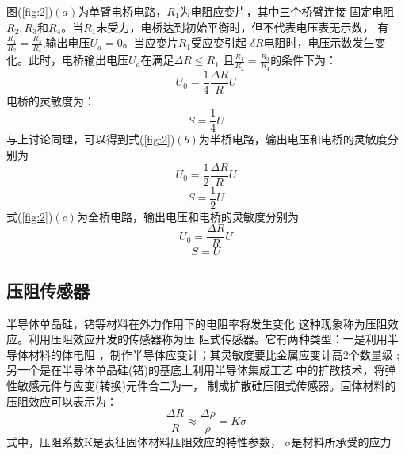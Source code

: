 \documentclass[a4paper,UTF8]{ctexart}
\begin{document}
    图(\ref*{fig:2})$(a)$为单臂电桥电路，$R_1$为电阻应变片，其中三个桥臂连接
固定电阻$R_2,R_3和R_4$。当$R_1$未受力，电桥达到初始平衡时，但不代表电压表无示数，
有$\frac{R_1}{R_2}=\frac{R_3}{R_4}$,输出电压$U_a=0$。当应变片$R_1$受应变引起
$\delta R$电阻时，电压示数发生变化。此时，电桥输出电压$U_a$在满足$\Delta R\leq R_1$
且$\frac{R_1}{R_2}=\frac{R_3}{R_4}$的条件下为：
\begin{equation}
    U_0=\frac{1}{4}\frac{\Delta R}{R}U
    \label{eqs:5}
\end{equation}
电桥的灵敏度为：
\begin{equation}
    S=\frac{1}{4}U
    \label{eqs:6}
\end{equation}
与上讨论同理，可以得到式(\ref*{fig:2})$(b)$为半桥电路，输出电压和电桥的灵敏度分别为
\begin{equation}
    U_0=\frac{1}{2}\frac{\Delta R}{R}U
    \label{eqs:7}    
\end{equation}
\begin{equation}
    S=\frac{1}{2}U
    \label{eqs:8}
\end{equation}
式(\ref*{fig:2})$(c)$为全桥电路，输出电压和电桥的灵敏度分别为
\begin{equation}
    U_0=\frac{\Delta R}{R}U
    \label{eqs:9}    
\end{equation}
\begin{equation}
    S=U
    \label{eqs:10}
\end{equation}

    \subsection*{压阻传感器}
半导体单晶硅，锗等材料在外力作用下的电阻率将发生变化
这种现象称为压阻效应。利用压阻效应开发的传感器称为压
阻式传感器。它有两种类型：一是利用半导体材料的体电阻
，制作半导体应变计；其灵敏度要比金属应变计高2个数量级
;另一个是在半导体单晶硅(锗)的基底上利用半导体集成工艺
中的扩散技术，将弹性敏感元件与应变(转换)元件合二为一，
制成扩散硅压阻式传感器。固体材料的压阻效应可以表示为：
\begin{equation}
    \frac{\Delta R}{R} \approx \frac{\Delta\rho}{\rho}=K\sigma
    \label{eqs:11}
\end{equation}
式中，压阻系数K是表征固体材料压阻效应的特性参数，
$\sigma$是材料所承受的应力
\end{document}
